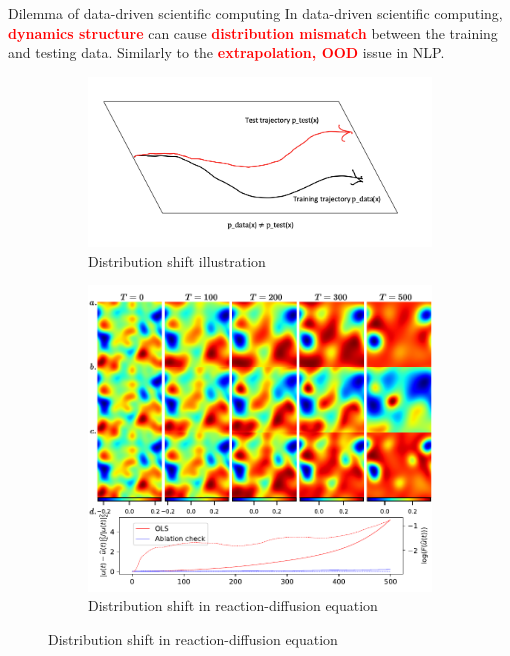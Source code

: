 \documentclass[NUS-Kajima workshop]{beamer}
\begin{document}
\begin{frame}{Dilemma of data-driven scientific computing}
	In data-driven scientific computing, \textcolor{red}{\textbf{dynamics structure}} can cause \textcolor{red}{\textbf{distribution mismatch}} between the training and testing data.
	Similarly to the \textcolor{red}{\textbf{extrapolation, OOD}} issue in NLP.
	\begin{figure}[ht]
		\centering
		\begin{subfigure}{0.5\linewidth} %
			\centering
			\includegraphics[width=\linewidth]{fig/dilemma.png}
			\caption{Distribution shift illustration}
		  \end{subfigure}%
		  \begin{subfigure}{0.5\linewidth} %
			\centering
			\includegraphics[width=\linewidth]{fig/RD-ds.pdf}
			\caption{Distribution shift in reaction-diffusion equation}
		  \end{subfigure}
	\end{figure}
\end{frame}
\end{document}
